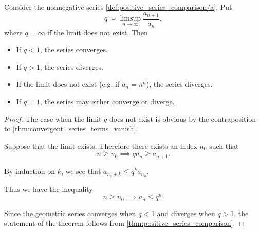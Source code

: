 \begin{proposition}\label{thm:dalamberts_ratio_test}\cite[theorem 3.33]{Rudin1991}
  Consider the nonnegative series \cref{def:positive_series_comparison/a}. Put
  \begin{equation*}
    q \coloneqq \limsup_{n \to \infty} \frac {a_{n+1}} {a_n},
  \end{equation*}
  where \( q = \infty \) if the limit does not exist. Then
  \begin{itemize}
    \item If \( q < 1 \), the series converges.
    \item If \( q > 1 \), the series diverges.
    \item If the limit does not exist (e.g. if \( a_n = n^n \)), the series diverges.
    \item If \( q = 1 \), the series may either converge or diverge.
  \end{itemize}
\end{proposition}
\begin{proof}
  The case when the limit \( q \) does not exist is obvious by the contraposition to \cref{thm:convergent_series_terms_vanish}.

  Suppose that the limit exists. Therefore there exists an index \( n_0 \) such that
  \begin{equation*}
    n \geq n_0 \implies q a_n \geq a_{n+1}.
  \end{equation*}

  By induction on \( k \), we see that \( a_{n_0 + k} \leq q^k a_{n_0} \).

  Thus we have the inequality
  \begin{equation*}
    n \geq n_0 \implies a_n \leq q^n.
  \end{equation*}

  Since the geometric series converges when \( q < 1 \) and diverges when \( q > 1 \), the statement of the theorem follows from \cref{thm:positive_series_comparison}.
\end{proof}
